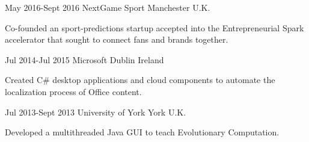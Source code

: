 \documentclass[10pt]{CurriculumVitae}
\begin{document}
      {May 2016-Sept 2016}
      {NextGame Sport} 
      {Manchester}
      {U.K.}
      {
        \item Co-founded an sport-predictions startup accepted into the Entrepreneurial Spark accelerator that sought to connect fans and brands together.
      }
  
      {Jul 2014-Jul 2015}
      {Microsoft} 
      {Dublin}
      {Ireland}
      {
        \item Created C\# desktop applications and cloud components to automate the localization process of Office content.
      }
    
      {Jul 2013-Sept 2013}
      {University of York}
      {York}
      {U.K.}
      {
        \item Developed a multithreaded Java GUI to teach Evolutionary Computation.
      } 
\end{document}
